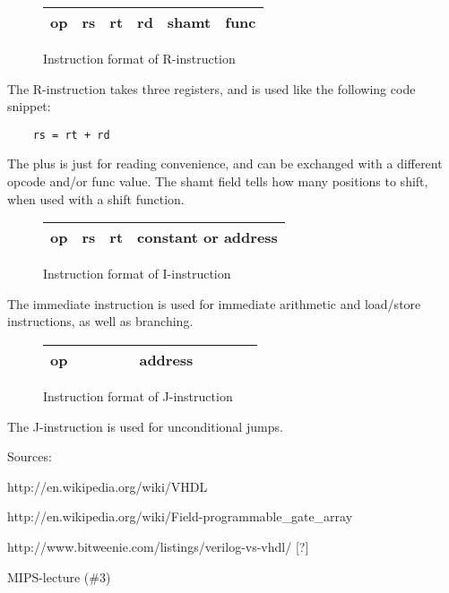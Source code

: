 \begin{figure}[ht]
    \centering
    \begin{tabular}{ | c | c | c | c | c | c | }
        \hline
        op & rs & rt & rd & shamt & func \\
        \hline
    \end{tabular}
    \caption{\label{fig:rInstruction}Instruction format of R-instruction}
\end{figure}

The R-instruction takes three registers, and is used like the following code
snippet:

\begin{verbatim}
    rs = rt + rd
\end{verbatim}

The plus is just for reading convenience, and can be exchanged with a different
opcode and/or func value. The shamt field tells how many positions to shift,
when used with a shift function.

\begin{figure}[ht]
    \centering
    \begin{tabular}{ | c | c | c |  c  | }
        \hline
        op & rs & rt & constant or address   \\
        \hline
    \end{tabular}
    \caption{\label{fig:iInstruction}Instruction format of I-instruction}
\end{figure}

The immediate instruction is used for immediate arithmetic and load/store
instructions, as well as branching. 


\begin{figure}[ht]
    \centering
    \begin{tabular}{ | c | c c c c c c c c c | }
        \hline
        op & & & & & address & & & &  \\
        \hline
    \end{tabular}
    \caption{\label{fig:jInstruction}Instruction format of J-instruction}
\end{figure}

The J-instruction is used for unconditional jumps.


Sources:

http://en.wikipedia.org/wiki/VHDL

http://en.wikipedia.org/wiki/Field-programmable_gate_array

http://www.bitweenie.com/listings/verilog-vs-vhdl/ [?]

MIPS-lecture (\#3)
